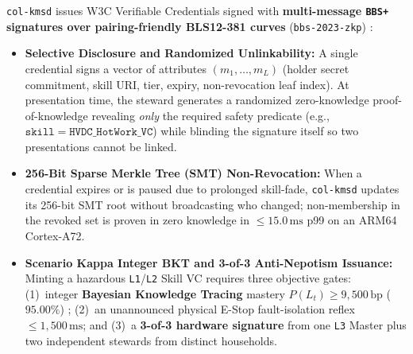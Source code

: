 \texttt{col-kmsd} issues W3C Verifiable Credentials signed with \textbf{multi-message \texttt{BBS+}
signatures over pairing-friendly BLS12-381 curves} (\texttt{bbs-2023-zkp})
\parencite{camenisch2004signature,goldwasser1989zkp,w3c2022vc}:
\begin{itemize}
\item \textbf{Selective Disclosure and Randomized Unlinkability:} A single credential signs a
        vector of attributes $(m_1, \dots, m_L)$ (holder secret commitment, skill URI, tier,
        expiry, non-revocation leaf index). At presentation time, the steward generates a
        randomized zero-knowledge proof-of-knowledge revealing \textit{only} the required safety
        predicate (e.g., $\mathtt{skill} = \mathtt{HVDC\_HotWork\_VC}$) while blinding the
        signature itself so two presentations cannot be linked.
\item \textbf{256-Bit Sparse Merkle Tree (SMT) Non-Revocation:} When a credential expires or is
        paused due to prolonged skill-fade, \texttt{col-kmsd} updates its 256-bit SMT root
        without broadcasting who changed; non-membership in the revoked set is proven in zero
        knowledge in $\le 15.0\,\mathrm{ms}$ p99 on an ARM64 Cortex-A72.
\item \textbf{Scenario Kappa Integer BKT and 3-of-3 Anti-Nepotism Issuance:} Minting a hazardous
        \texttt{L1}/\texttt{L2} Skill VC requires three objective gates: (1)~integer \textbf{Bayesian
        Knowledge Tracing} mastery $P(L_t) \ge 9{,}500\,\mathrm{bp}$ ($95.00\%$)
        \parencite{corbett1995bkt}; (2)~an unannounced physical E-Stop fault-isolation reflex
        $\le 1{,}500\,\mathrm{ms}$; and (3)~a \textbf{3-of-3 hardware signature} from one \texttt{L3}
        Master plus two independent stewards from distinct households.
\end{itemize}

